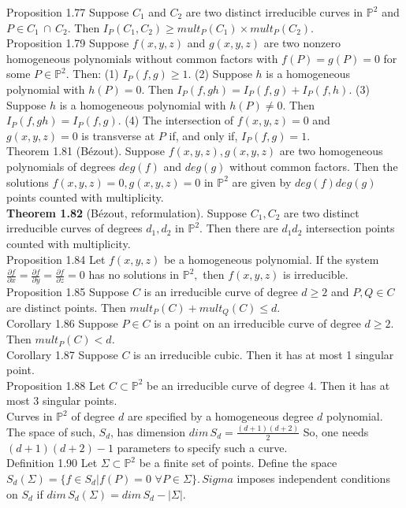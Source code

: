 \documentclass[8pt]{extarticle}
\begin{document}
Proposition 1.77 Suppose $C_1$ and $C_2$ are two distinct irreducible curves in $\mathbb{P}^2$ and $P \in C_1\,\cap\,C_2.$ Then $I_P (C_1, C_2) \ge mult_P(C_1) \times mult_P (C_2).$\\
Proposition 1.79 Suppose $f(x,y,z)$ and $g(x,y,z)$ are two nonzero homogeneous polynomials without common factors with $f(P) = g(P) = 0$ for some $P \in \mathbb{P}^2.$ Then: (1) $I_P(f,g)\ge 1.$ (2) Suppose $h$ is a homogeneous polynomial with $h(P ) = 0.$ Then
$I_P (f, gh) = I_P (f, g) + I_P (f, h).$ (3) Suppose $h$ is a homogeneous polynomial with $h(P ) \ne 0.$ Then
$I_P (f, gh) = I_P (f, g).$ (4) The intersection of $f(x,y,z)=0$ and $g(x,y,z)=0$ is transverse at $P$ if, and only if, $I_P(f,g)=1.$\\
Theorem 1.81 (B\'ezout). Suppose $f(x,y,z),g(x,y,z)$ are two homogeneous polynomials of degrees $deg(f)$
and $deg(g)$ without common factors. Then the solutions $f(x,y,z) = 0, g(x,y,z) = 0$
in $\mathbb{P}^2$ are given by $deg(f)deg(g)$ points counted with multiplicity.\\
\textbf{Theorem 1.82} (B\'ezout, reformulation). Suppose $C_1, C_2$ are two distinct irreducible curves of degrees $d_1, d_2$ in $\mathbb{P}^2.$ Then there are $d_1d_2$ intersection points counted with multiplicity.\\
Proposition 1.84 Let $f(x,y,z)$ be a homogeneous polynomial. If the system $\frac{\partial f}{\partial
 x}=\frac{\partial f}{\partial
 y}=\frac{\partial f}{\partial
 z}=0$ has no solutions in $\mathbb{P}^2,$ then $f(x,y,z)$ is irreducible.\\
 Proposition 1.85 Suppose $C$ is an irreducible curve of degree $d \ge 2$ and $P,Q \in C$ are distinct points.
Then $mult_P(C)+mult_Q(C)\leq d.$\\
Corollary 1.86 Suppose $P \in C$ is a point on an irreducible curve of degree $d \ge 2.$ Then $mult_P (C) < d.$\\
Corollary 1.87 Suppose $C$ is an irreducible cubic. Then it has at most 1 singular point.\\
Proposition 1.88 Let $C \subset \mathbb{P}^2$ be an irreducible curve of degree 4. Then it has at most 3 singular points.\\
Curves in $\mathbb{P}^2$ of degree $d$ are specified by a homogeneous degree $d$ polynomial. The space of such, $S_d$, has
dimension $dim\,S_d=\frac{(d+1)(d+2)}{2}$ So, one needs $(d+1)(d+2)-1$ parameters to specify such a curve.\\
Definition 1.90 Let $\Sigma \subset \mathbb{P}^2$ be a finite set of points. Define the space $S_d(\Sigma)=\{f\in S_d |f(P)=0\,\,\forall P\in\Sigma\}.\,Sigma$ imposes independent conditions on $S_d$ if $dim\,S_d(\Sigma) = dim\,S_d-|\Sigma|.$\\
\end{document}

